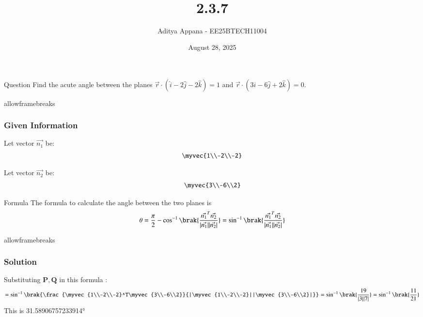 \documentclass{beamer}
\title %
{2.3.7}
\date{August 28, 2025}
\author %
{Aditya Appana - EE25BTECH11004}
\begin{document}
\frame{\titlepage}
\begin{frame}{Question}
Find the acute angle between the planes $ \vec{r} \cdot (\hat{i} - 2\hat{j} - 2\hat{k} ) = 1$ and  $ \vec{r} \cdot (3\hat{i} - 6\hat{j} + 2\hat{k})=0$.

\end{frame}
\begin{frame}{allowframebreaks}
\frametitle{Given Information}

    \centering
    
    \label{tab:parameters}
    
    
    Let vector $\vec{n_1}$ be: \begin{align}
    \myvec{1\\-2\\-2}
    \end{align}
    

    Let vector $\vec{n_2}$ be: \begin{align}\myvec{3\\-6\\2}\end{align}
    \label{0.2}

   
\end{frame}


\begin{frame}{Formula}
The formula to calculate the angle between the two planes is
\begin{align}
\theta = \frac{\pi}{2} - \cos^{-1}\brak{\frac{\vec{n_1}^T\vec{n_2}}{|\vec{n_1}||\vec{n_2}|}}
= \sin^{-1}\brak{\frac{\vec{n_1}^T\vec{n_2}}{|\vec{n_1}||\vec{n_2}|}}
\end{align}



\end{frame}

\begin{frame}{allowframebreaks}
\frametitle{Solution}
Substituting $\mathbf{P, Q}$ in this formula :
\begin{align*}
= \sin^{-1}\brak{\frac{\myvec{1\\-2\\-2}^T\myvec{3\\-6\\2}}{|\myvec{1\\-2\\-2}||\myvec{3\\-6\\2}|}}
= \sin^{-1}\brak{\frac{19}{|3||7|}}
= \sin^{-1}\brak{\frac{11}{21}}
\end{align*}
\centering
This is 31.58906757233914°
\end{frame}
\end{document}
